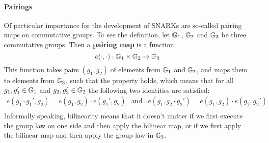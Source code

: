 \paragraph{Pairings}
Of particular importance for the development of SNARKs are so-called pairing maps on commutative groups. To see the definition, let $\mathbb{G}_1$, $\mathbb{G}_2$ and $\mathbb{G}_3$ be three commutative groups. Then a \textbf{pairing map} is a function
\begin{equation}\label{pairing-map}
e(\cdot,\cdot): \mathbb{G}_1 \times \mathbb{G}_2 \to \mathbb{G}_3
\end{equation}
This function takes pairs $(g_1,g_2)$ of elements from $\mathbb{G}_1$ and $\mathbb{G}_2$, and maps them to elements from $\mathbb{G}_3$, such that the  property holds, which means that for all $g_1,g_1'\in \mathbb{G}_1$ and $g_2, g_2'\in \mathbb{G}_2$ the following two identities are satisfied:
\begin{equation}
\begin{array}{lcr}
e(g_1 \cdot g_1',g_2)= e(g_1,g_2)\cdot e(g_1',g_2) &\text{and}&
e(g_1,g_2 \cdot g_2')= e(g_1,g_2)\cdot e(g_1,g_2')\\
\end{array}
\end{equation}
Informally speaking, bilinearity means that it doesn't matter if we first execute the group law on one side and then apply the bilinear map, or if we first apply the bilinear map and then apply the group law in $\mathbb{G}_3$. 

